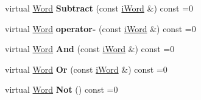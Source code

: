 \begin{DoxyCompactItemize}
\item 
\hypertarget{classiWord_af69a5e10e094e3fc30fae0b651d95ea6}{
virtual \hyperlink{classWord}{Word} {\bfseries Subtract} (const \hyperlink{classiWord}{iWord} \&) const =0}
\label{classiWord_af69a5e10e094e3fc30fae0b651d95ea6}

\item 
\hypertarget{classiWord_a432fb05081debadb601d86cca05152c8}{
virtual \hyperlink{classWord}{Word} {\bfseries operator-\/} (const \hyperlink{classiWord}{iWord} \&) const =0}
\label{classiWord_a432fb05081debadb601d86cca05152c8}

\item 
\hypertarget{classiWord_ae9f6bbc855712a208835d12cb3e40577}{
virtual \hyperlink{classWord}{Word} {\bfseries And} (const \hyperlink{classiWord}{iWord} \&) const =0}
\label{classiWord_ae9f6bbc855712a208835d12cb3e40577}

\item 
\hypertarget{classiWord_a24a8821a44701deda1dd70972447172f}{
virtual \hyperlink{classWord}{Word} {\bfseries Or} (const \hyperlink{classiWord}{iWord} \&) const =0}
\label{classiWord_a24a8821a44701deda1dd70972447172f}

\item 
\hypertarget{classiWord_a6a7602a8220d84b5201a789b597fbbde}{
virtual \hyperlink{classWord}{Word} {\bfseries Not} () const =0}
\label{classiWord_a6a7602a8220d84b5201a789b597fbbde}


\end{DoxyCompactItemize}
